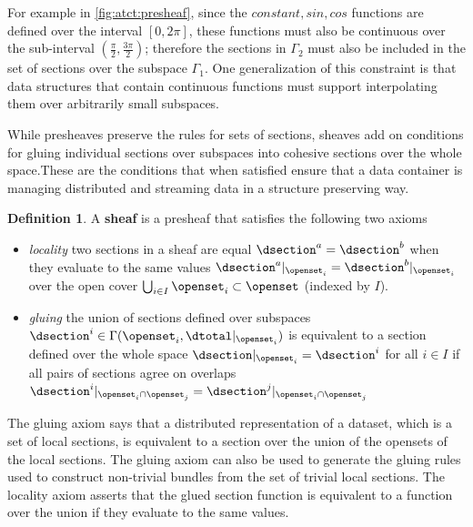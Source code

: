\documentclass[review]{vgtc}
\theoremstyle{definition}
\newtheorem{definition}{Definition}[section]
\theoremstyle{remark}
\begin{document}
For example in \autoref{fig:atct:presheaf}, since the $constant, sin, cos$ functions are defined over the interval $\left[0,2\pi\right]$, these functions must also be continuous over the sub-interval $\left(\frac{\pi}{2}, \frac{3\pi}{2}\right)$; therefore the sections in $\Gamma_{2}$ must also be included in the set of sections over the subspace $\Gamma_{1}$. One generalization of this constraint is that data structures that contain continuous functions must support interpolating them over arbitrarily small subspaces.

While presheaves preserve the rules for sets of sections, sheaves add on conditions for gluing individual sections over subspaces into cohesive sections over the whole space.These are the conditions that when satisfied ensure that a data container is managing distributed and streaming data in a structure preserving way.

\begin{definition}\label{def:atct:sheaf}\cite{bakerEuclideanSpaceMathsSheaf,spanier1989algebraic} A \textbf{sheaf} is a presheaf that satisfies the following two axioms
\begin{itemize}
  \item \textit{locality} two sections in a sheaf are equal $\dsection^{a} = \dsection^{b}$ when they evaluate to the same values $\dsection^{a}\vert_{\openset_i} =  \dsection^{b}\vert_{\openset_i}$ over the open cover $\bigcup_{i\in I} \openset_{i} \subset \openset$ (indexed by $I$).
  \item \textit{gluing} the union of sections defined over subspaces $\dsection^{i} \in \Gamma(\openset_i, \dtotal|_{\openset_i})$ is equivalent to a section defined over the whole space $\dsection\vert_{\openset_i} = \dsection^{i}$ for all $i\in I$ if all pairs of sections agree on overlaps $\dsection^{i}\vert_{\openset_i\cap\openset_j} =  \dsection^{j}\vert_{\openset_i\cap\openset_j}$
  \end{itemize}
\end{definition}

The gluing axiom says that a distributed representation of a dataset, which is a set of local sections, is equivalent to a section over the union of the opensets of the local sections. The gluing axiom can also be used to generate the gluing rules used to construct non-trivial bundles from the set of trivial local sections. The locality axiom asserts that the glued section function is equivalent to a function over the union if they evaluate to the same values.
\end{document}
